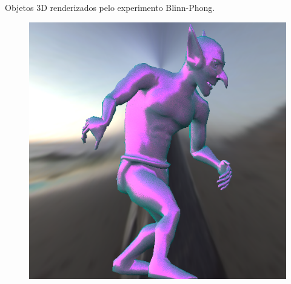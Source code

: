 \begin{frame}{Objetos 3D renderizados pelo experimento Blinn-Phong.}
\begin{figure}[H]
\endminipage\hfill
{}%
  \includegraphics[width=\linewidth]{./Imagens/brdfs/blinn-phong-goblin.png}
\endminipage
\end{figure}
\end{frame}

